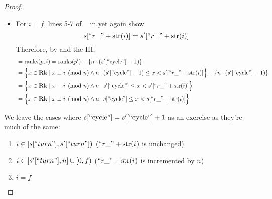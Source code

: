 \documentclass{amsart}
\DeclareMathOperator{\Rk}{\mathbf{Rk}}
\DeclareMathOperator{\zpostpop}{z_{\mathrm{post-pop}}}
\DeclareMathOperator{\ranks}{\mathrm{ranks}}
\theoremstyle{definition}
\begin{document}
\begin{proof}
\begin{enumerate}
\begin{enumerate}
\begin{itemize}
                        \item For $i = f$, lines 5-7 of $\zpostpop$ in  yet again show
                            $$s[``r\_" + \mathrm{str}(i)] = s^\prime[``r\_" + \mathrm{str}(i)]$$
                            Therefore, by  and the IH,
                            \begin{align*}
                                &= \ranks(p, i) = \ranks(p^\prime) - \{n \cdot (s^\prime[``\text{cycle}"] - 1)\}\\
                                &= \Big\{x \in \Rk \mid x \equiv i \pmod n \land n \cdot (s^\prime[``\text{cycle}"] - 1) \leq x < s^\prime[``r\_" + \mathrm{str}(i)]\Big\} 
                                    - \{n \cdot (s^\prime[``\text{cycle}"] - 1)\}\\
                                &= \Big\{x \in \Rk \mid x \equiv i \pmod n \land n \cdot s^\prime[``\text{cycle}"] \leq x < s^\prime[``r\_" + \mathrm{str}(i)]\Big\}\\
                                &= \Big\{x \in \Rk \mid x \equiv i \pmod n \land n \cdot s[``\text{cycle}"] \leq x < s[``r\_" + \mathrm{str}(i)]\Big\}
                            \end{align*}
                    \end{itemize}

                    We leave the cases where $s[``\text{cycle}"] = s^\prime[``\text{cycle}"] + 1$ as an exercise as they're much of the same:
                    \begin{enumerate}
                        \item $i \in [s[``turn"], s^\prime[``turn"])$ \; ($``r\_" + \mathrm{str}(i)$ is unchanged)
                        \item $i \in [s^\prime[``turn"], n] \cup [0, f)$ \; ($``r\_" + \mathrm{str}(i)$ is incremented by $n$)
                        \item $i = f$ \qedhere
                    \end{enumerate}
            \end{enumerate}
    \end{enumerate}
\end{proof}
\end{document}
